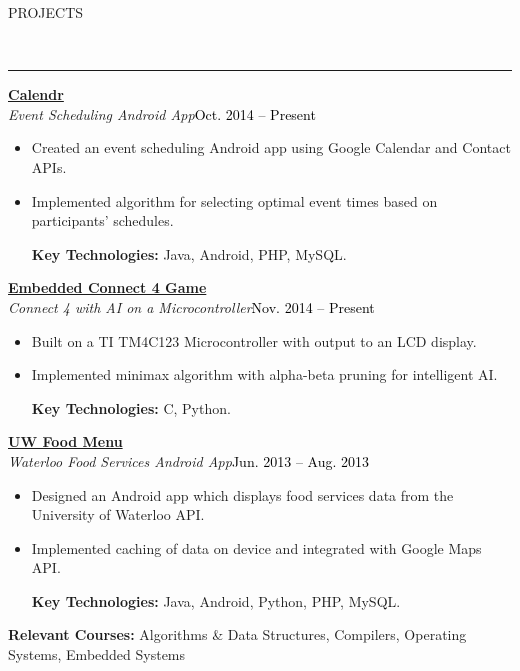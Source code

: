 \documentclass[11pt, letterpaper, oneside]{article}
\newcommand{\HRule}[2]{\textcolor{#1}{\rule{\linewidth}{#2}}}
\newcommand{\sectiontitle}[1]{\begin{minipage}{\textwidth}\vspace{-7.5pt}\begin{flushleft}\hspace{-20.5pt}\vspace{-25pt}
\Large\MakeUppercase{#1}\end{flushleft}\end{minipage}\\\HRule{black}{0.15mm}\vspace{\baselineskip}}
\newenvironment{ressection}[1]{
  \sectiontitle{#1}}
  {\vspace{-\baselineskip}}
\newcommand{\resentryheader}[4]{
    \vspace{-6pt}
    \textbf{#1}\hspace{\stretch{1}}\textcolor{black}{#3}\\
    \textit{#2}\hspace{\stretch{1}}\textcolor{black}{#4}\\
}
\newcommand{\resitem}[1]{
    \vspace{2pt}
    \item \begin{flushleft} #1 \end{flushleft}
}
\newenvironment{resentry}[4]{
  \begin{minipage}{\textwidth}
  \vspace{-3pt}
    \resentryheader{#1}{#2}{#3}{#4}
        \vspace{-\baselineskip}
    \begin{itemize}[noitemsep,nolistsep]
}{
    \end{itemize}
        \vspace{\baselineskip}
        \end{minipage}
}
\begin{document}
\begin{ressection}{Projects}
  \begin{resentry}{\href{https://github.com/shamak/HTN_Scheduler}{Calendr}}{Event Scheduling Android App}{}{Oct. 2014 -- Present}
    \resitem{Created an event scheduling Android app using Google Calendar and Contact APIs.}
    \resitem{Implemented algorithm for selecting optimal event times based on participants' schedules.}
    \vspace{4pt} \hspace{-15pt}
    \textbf{Key Technologies:} Java, Android, PHP, MySQL.
  \end{resentry}
  \begin{resentry}{\href{https://github.com/coreywu/Connect4}{Embedded Connect 4 Game}}{Connect 4 with AI on a Microcontroller}{}{Nov. 2014 -- Present}
    \resitem{Built on a TI TM4C123 Microcontroller with output to an LCD display. }
    \resitem{Implemented minimax algorithm with alpha-beta pruning for intelligent AI.}
    \vspace{4pt} \hspace{-15pt}
    \textbf{Key Technologies:} C, Python.
  \end{resentry}
  \begin{resentry}{\href{https://play.google.com/store/apps/details?id=ca.uwaterloo.uwfoodservices&hl=en}{UW Food Menu}}{Waterloo Food Services Android App}{}{Jun. 2013 -- Aug. 2013}
    \resitem{Designed an Android app which displays food services data from the University of Waterloo API.}
    \resitem{Implemented caching of data on device and integrated with Google Maps API.}
    \vspace{4pt} \hspace{-15pt}
    \textbf{Key Technologies:} Java, Android, Python, PHP, MySQL.
  \end{resentry}
  \textbf{Relevant Courses:} Algorithms \& Data Structures, Compilers, Operating Systems, Embedded Systems
\end{ressection}
\end{document}
